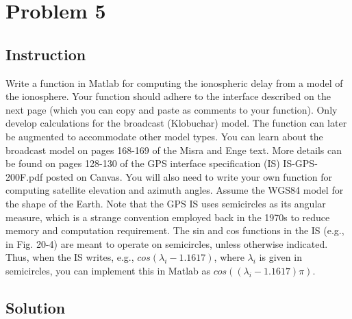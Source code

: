 \section{Problem 5}

\subsection{Instruction}

Write a function in Matlab for computing the ionospheric delay from a model of
the ionosphere. Your function should adhere to the interface described on the
next page (which you can copy and paste as comments to your function). Only
develop calculations for the broadcast (Klobuchar) model. The function can later
be augmented to accommodate other model types. You can learn about the broadcast
model on pages 168-169 of the Misra and Enge text. More details can be found on
pages 128-130 of the GPS interface specification (IS) IS-GPS-200F.pdf posted on
Canvas. You will also need to write your own function for computing satellite
elevation and azimuth angles. Assume the WGS84 model for the shape of the Earth.
Note that the GPS IS uses semicircles as its angular measure, which is a strange
convention employed back in the 1970s to reduce memory and computation
requirement. The sin and cos functions in the IS (e.g., in Fig. 20-4) are meant
to operate on semicircles, unless otherwise indicated. Thus, when the IS writes,
e.g., $cos(\lambda_i −1.1617)$, where $\lambda_i$ is given in semicircles, you
can implement this in Matlab as $cos((\lambda_i −1.1617)\pi)$.

\subsection{Solution}


